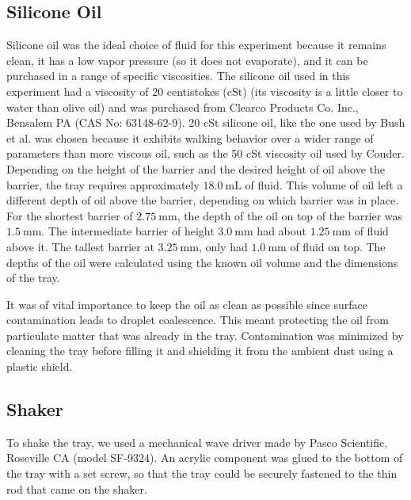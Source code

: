 \subsection{Silicone Oil}
    Silicone oil was the ideal choice of fluid for this experiment because it remains clean, it has a low vapor pressure (so it does not evaporate), and it can be purchased in a range of specific viscosities. The silicone oil used in this experiment had a viscosity of 20 centistokes (cSt) (its viscosity is a little closer to water than olive oil) and was purchased from Clearco Products Co. Inc., Bensalem PA (CAS No: 63148-62-9). 20 cSt silicone oil, like the one used by Bush et al. was chosen because it exhibits walking behavior over a wider range of parameters than more viscous oil, such as the 50 cSt viscosity oil used by Couder. Depending on the height of the barrier and the desired height of oil above the barrier, the tray requires approximately $18.0~\mathrm{mL}$ of fluid. This volume of oil left a different depth of oil above the barrier, depending on which barrier was in place. For the shortest barrier of $2.75~\mathrm{mm}$, the depth of the oil on top of the barrier was $1.5~\mathrm{mm}$. The intermediate barrier of height $3.0~\mathrm{mm}$ had about $1.25~\mathrm{mm}$ of fluid above it. The tallest barrier at $3.25~\mathrm{mm}$, only had $1.0~\mathrm{mm}$ of fluid on top. The depths of the oil were calculated using the known oil volume and the dimensions of the tray.
    
    It was of vital importance to keep the oil as clean as possible since surface contamination leads to droplet coalescence. This meant protecting the oil from particulate matter that was already in the tray. Contamination was minimized by cleaning the tray before filling it and shielding it from the ambient dust using a plastic shield.
    
\subsection{Shaker}
    To shake the tray, we used a mechanical wave driver made by Pasco Scientific, Roseville CA (model SF-9324). An acrylic component was glued to the bottom of the tray with a set screw, so that the tray could be securely fastened to the thin rod that came on the shaker.
    
